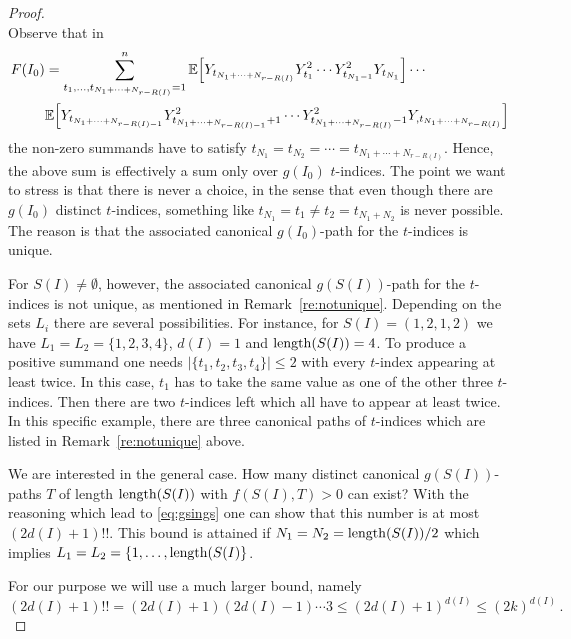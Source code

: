 \begin{proof}
\begin{equation}
\end{equation}
Observe that in 
\begin{equation*}
\begin{split}
F(I_0) &= \sum_{t_1,\ldots,t_{N_1+\cdots+N_{r-R(I)}}=1}^n \mathbb{E}\Big[ Y_{t_{N_1+\cdots+N_{r-R(I)}}} Y_{t_1}^2 
\cdots Y_{t_{N_1-1}}^2Y_{t_{N_1}} \Big] \cdots \\
& \mathbb{E}\Big[Y_{t_{N_1+\cdots+N_{r-R(I)-1}}} Y_{t_{N_1+\cdots+N_{r-R(I)-1}}+1}^2 \cdots Y_{t_{N_1+\cdots+N_{r-R(I)}}-1}^2Y_{,t_{N_1+\cdots+N_{r-R(I)}}} \Big]
\end{split}
\end{equation*}
the non-zero summands have to satisfy $t_{N_1}=t_{N_2}= \cdots =t_{N_1+\cdots+N_{r-R(I)}}$.  Hence, the above sum is effectively a 
sum only over $g(I_0)$ $t$-indices. The point we want to stress is that there is never a choice, in the sense that even though there are $g(I_0)$ distinct $t$-indices, something like $t_{N_1}=t_1\neq t_2=t_{N_1+N_2}$ is never possible. The reason is that the associated canonical $g(I_0)$-path for the $t$-indices is unique.

For $S(I)\neq \emptyset$, however, the associated canonical $g(S(I))$-path for the $t$-indices is not unique, as mentioned in Remark~\ref{re:notunique}. Depending on the sets $L_i$ there are several possibilities. For instance, for $S(I)=(1,2,1,2)$ we have $L_1=L_2=\{1,2,3,4\}$, $d(I)=1$ and $\operatorname{length}(S(I))=4$. To produce a positive summand one needs $|\{ t_1,t_2,t_3,t_4\}|\le 2$ with every $t$-index appearing at least twice. In this case, $t_1$ has to take the same value as one of the other three $t$-indices. Then there are two $t$-indices left 
which all have to appear at least twice. In this specific example, there are three  canonical paths of $t$-indices 
which are listed in Remark~\ref{re:notunique} above. 

We are interested in the general case. How many distinct canonical $g(S(I))$-paths $T$ of length $\operatorname{length}(S(I))$ with $f(S(I),T)>0$ can exist? With the reasoning which lead to \eqref{eq:gsings} one can show that this number is at most $(2d(I)+1)!!$. This bound is attained if $N_1=N_2=\operatorname{length}(S(I))/2$ which implies $L_1=L_2=\{1,\ldots,\operatorname{length}(S(I)\}$. %

For our purpose we will use a much larger bound, namely
\begin{equation}\label{eq:nnnnnnnnn}
(2d(I)+1)!! = (2d(I)+1) (2d(I)-1)\cdots 3 \le (2d(I)+1)^{d(I)} \le (2k)^{d(I)}\,.
\end{equation}


\end{proof}
